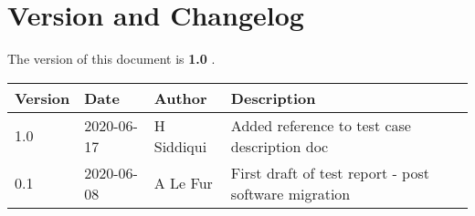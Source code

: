 \section{Version and Changelog}

The version of this document is {\bf 1.0} .

\begin{table}[H]
    \begin{tabular}{|l|l|l|p{10cm}| }
    \hline
    {\bf Version} & {\bf Date} & {\bf Author} & {\bf Description} \\ \hline
    1.0 & 2020-06-17 & H Siddiqui & Added reference to test case description doc\\ \hline
    0.1 & 2020-06-08 & A Le Fur & First draft of test report - post software migration\\ \hline
    \end{tabular}
\end{table}
